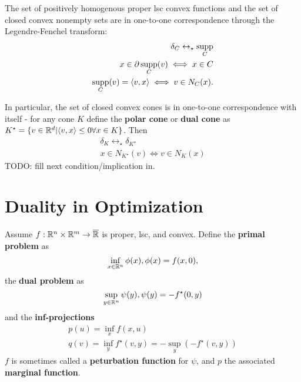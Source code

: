 \begin{thm}
  \label{sec:conjugate-functions-14}
  The set of positively homogenous proper lsc convex functions and the
  set of closed convex nonempty sets are in one-to-one correspondence
  through the Legendre-Fenchel transform:
  \begin{align}
    \label{eq:28}
    \delta_{C} \leftrightarrow_{\star} \supp_{C} \\
    \label{eq:29}
    x \in \partial \supp_{C}(v) \iff x \in C \\
    \label{eq:30}
    \supp_{C}(v) = \IP{v, x} \iff v \in N_{C}(x).
  \end{align}

  In particular, the set of closed convex cones is in one-to-one
  correspondence with itself - for any cone $K$ define the
  \textbf{polar cone} or \textbf{dual cone} as $K^{\star} = \{ v \in
  \R^{d} | \IP{v, x} \leq 0 \forall x \in K \} $.  Then
  \begin{align}
    \label{eq:31}
    \delta_{K} \leftrightarrow_{\star} \delta_{K^{\star}} \\
    \label{eq:32}
    x \in N_{K^{\star}}(v) \iff v \in N_{K}(x) %
  \end{align}
  TODO: fill next condition/implication in.
\end{thm}

\section{Duality in Optimization}
\label{sec:duality-optimization}

\begin{defn}
  \label{sec:duality-optimization-1}
  Assume $f: \mathbb{R}^{n} \times \mathbb{R}^{m} \rightarrow \overline {\mathbb{R}}$ is proper,
  lsc, and convex.  Define the \textbf{primal problem} as
  \begin{equation}
    \label{eq:33}
    \inf_{x \in \mathbb{R}^{n}} \phi(x), \phi(x) = f(x, 0),
  \end{equation} the \textbf{dual problem} as
  \begin{equation}
    \label{eq:34}
    \sup_{y \in \mathbb{R}^{n}} \psi(y), \psi(y) = -f^{\star}(0, y)
  \end{equation}
  and the \textbf{inf-projections}
  \begin{align}
    \label{eq:35}
    p(u) = \inf_{x} f(x, u) \\
    \label{eq:36}
    q(v) = \inf_{y} f^{\star}(v, y) = -\sup_{y} (-f^{\star}(v, y))
  \end{align}
  $f$ is sometimes called a \textbf{peturbation function} for $\psi$,
  and $p$ the associated \textbf{marginal function}.
\end{defn}

